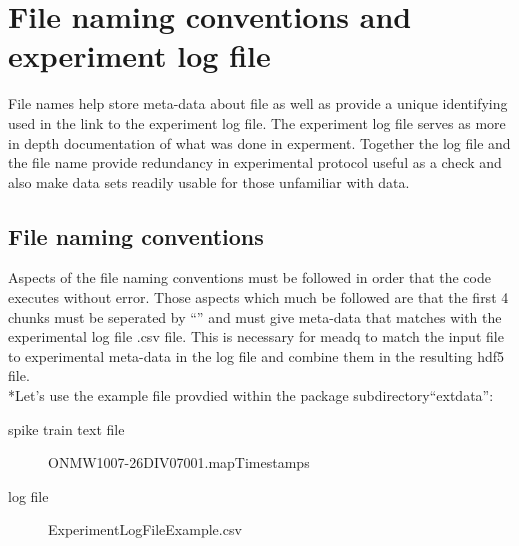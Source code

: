 \documentclass{article}\usepackage[]{graphicx}\usepackage[]{color}
\begin{document}
\section*{File naming conventions and experiment log file } 
File names help store meta-data about file as well as provide a unique identifying used in the link to the experiment log file.  The experiment log file serves as more in depth documentation of what was done in experment.  Together the log file and the file name provide redundancy in experimental protocol useful as a check and also make data sets readily usable for those unfamiliar with data.

\subsection*{File naming conventions}
Aspects of the file naming conventions must be followed in order that the code executes without error. Those aspects which much be followed are that the first 4 chunks must be seperated by ``\textunderscore '' and must give meta-data that matches with the experimental log file .csv file. This is necessary for meadq to match the input file to experimental meta-data in the log file and combine them in the resulting hdf5 file. 
\\*Let's use the example file provdied within the package subdirectory``extdata'': 

\begin{description}
\item[spike train text file]
ON\textunderscore MW1007-26\textunderscore DIV07\textunderscore 001.mapTimestamps 
\item[log file] Experiment\textunderscore LogFileExample.csv
\end{description}
\end{document}
